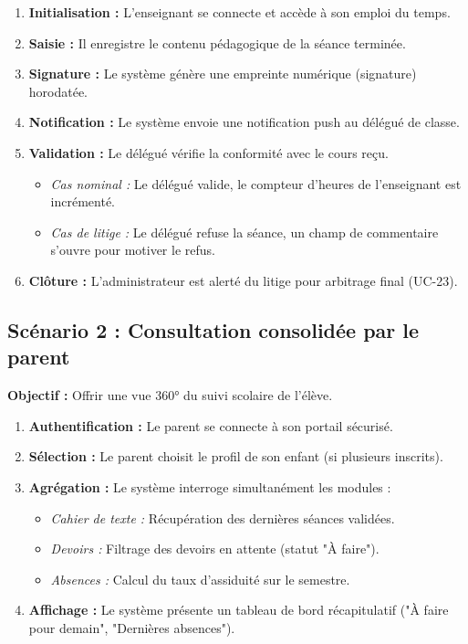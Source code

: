 \documentclass[a4paper, 11pt]{article}
\begin{document}
\begin{enumerate}
    \item \textbf{Initialisation :} L'enseignant se connecte et accède à son emploi du temps.
    \item \textbf{Saisie :} Il enregistre le contenu pédagogique de la séance terminée.
    \item \textbf{Signature :} Le système génère une empreinte numérique (signature) horodatée.
    \item \textbf{Notification :} Le système envoie une notification push au délégué de classe.
    \item \textbf{Validation :} Le délégué vérifie la conformité avec le cours reçu.
    \begin{itemize}
        \item \textit{Cas nominal :} Le délégué valide, le compteur d'heures de l'enseignant est incrémenté.
        \item \textit{Cas de litige :} Le délégué refuse la séance, un champ de commentaire s'ouvre pour motiver le refus.
    \end{itemize}
    \item \textbf{Clôture :} L'administrateur est alerté du litige pour arbitrage final (UC-23).
\end{enumerate}

\subsection*{Scénario 2 : Consultation consolidée par le parent}
\textbf{Objectif :} Offrir une vue 360° du suivi scolaire de l'élève.

\begin{enumerate}
    \item \textbf{Authentification :} Le parent se connecte à son portail sécurisé.
    \item \textbf{Sélection :} Le parent choisit le profil de son enfant (si plusieurs inscrits).
    \item \textbf{Agrégation :} Le système interroge simultanément les modules :
    \begin{itemize}
        \item \textit{Cahier de texte :} Récupération des dernières séances validées.
        \item \textit{Devoirs :} Filtrage des devoirs en attente (statut "À faire").
        \item \textit{Absences :} Calcul du taux d'assiduité sur le semestre.
    \end{itemize}
    \item \textbf{Affichage :} Le système présente un tableau de bord récapitulatif ("À faire pour demain", "Dernières absences").
\end{enumerate}
\end{document}
